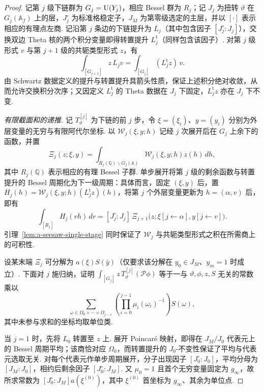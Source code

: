 \begin{proof}
记第 $j$ 级下链群为 $G_j=\operatorname{U}(Y_j)$，相应 Bessel 群为 $R_j$；记 $J_j$ 为扭转 $\vartheta$ 在 $G_j(\mathbb A_f)$ 上的层，$J_j^\circ$ 为标准格稳定子，$J_M$ 为第零级选定的主层，并以 $[\cdot]$ 表示相应的有理点左商. 记沿第 $j$ 条边的下链提升为 $L_j$（其中包含因子 $[J_j^\circ:J_j]$），交换双边 Theta 核的两个积分变量即得转置提升 $L_j^{\mathrm t}$（同样包含该因子）. 对第 $j$ 级形式 $v$ 与第 $j+1$ 级的共轭类型形式 $z$，有
\[
 \int_{[G_{j+1}]} z\,L_jv
   =\int_{[G_j]}(L_j^{\mathrm t}z)\,v .
\]
由 Schwartz 数据定义的提升与转置提升具箭头性质，保证上述积分绝对收敛，从而允许交换积分次序；又因定义 $L_j^{\mathrm t}$ 的 Theta 数据在 $J_j$ 下固定，$L_j^{\mathrm t}z$ 亦在 $J_j$ 下不变.

\emph{有限截面和的递推.}
记 $T_\vartheta^{[j]}$ 为下链的前 $j$ 步，令 $\xi=(\xi_i)$、$y=(y_i)$ 分别为外层变量的无穷与有限阿代尔坐标. 以 $\mathcal W_j(\xi,y;h)$ 记经 $j$ 次展开后在 $G_j$ 上余下的函数，并置
\[
 \Xi_j(z;\xi,y)=\int_{R_j(\mathbb Q)\backslash G_j(\mathbb A)}
                    \mathcal W_j(\xi,y;h)z(h)\,dh ,
\]
其中 $R_j(\mathbb Q)$ 表示相应的有理 Bessel 子群. 单步展开将第 $j$ 级的剩余函数与转置提升的 Bessel 周期化为下一级周期：具体而言，固定 $(\xi,y)$ 后，置
$H_j(h)=\mathcal W_j(\xi,y;h)(L_j^{\mathrm t}z)(h)$，将第 $j$ 个外层变量更新为 $h=(\alpha,v)$ 后，即有
\[
 \int_{[R_j]}H_j(rh)\,dr
    =[J_j^\circ:J_j]\,
      \Xi_{j+1}\bigl(z;\xi[j\leftarrow\alpha],y[j\leftarrow v]\bigr).
\]
引理~\ref{lem:a-seesaw-single-stage} 同时保证了 $\mathcal W_j$ 与共轭类型形式之积在所需商上的可积性.

设某末端 $\Xi_j$ 可分解为 $a(\xi)S(\bar y)$（仅要求该分解在 $y_0\in J_M$、$y_m=1$ 时成立）. 下面对 $j$ 施归纳，证明 $\int_{[G_j]}z\,T_\vartheta^{[j]}(\mathcal P\phi)$ 等于一与 $\vartheta,\phi,z,S$ 无关的常数乘以
\[
 \sum_{\omega\in\Omega_0\times\cdots\times\Omega_{j-1}}
   \left(\prod_{i=0}^{j-1}\mu_i(\omega_i)^{-1}\right)S(\omega),
\]
其中未参与求和的坐标均取单位类.

当 $j=1$ 时，先将 $L_0$ 转置至 $z$ 上. 展开 Poincaré 映射，即得在 $J_M/J_0$ 代表元上的 Bessel 周期平均；该商恰对应 $\Omega_0$，而转置提升的 $J_0$-不变性保证了平均与代表元选取无关. 对每个代表元作单步周期展开，分子出现因子 $[J_0^\circ:J_0]$，平均分母为 $[J_M:J_0]$，相约后剩余因子 $[J_0^\circ:J_M]$. 又 $\mu_0=1$ 且首个无穷变量固定为 $g_\infty$，故所求常数为 $[J_0^\circ:J_M]a(\xi^{(0)})$，其中 $\xi^{(0)}$ 首坐标为 $g_\infty$、其余为单位点.


\end{proof}
